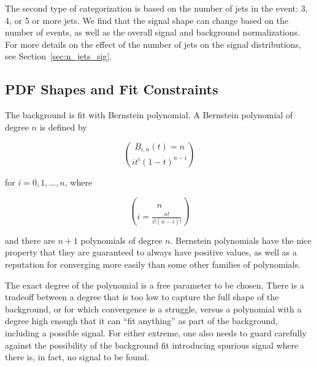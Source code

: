 The second type of categorization is based on the number of 
jets in the event: 3, 4, or 5 or more jets.  We find that the signal
shape can change based on the number of events, as well as the overall
signal and background normalizations.  For more details on the effect of 
the number of jets on the signal distributions, see Section~\ref{sec:n_jets_sig}. 




\subsection{PDF Shapes and Fit Constraints}
\label{sec:pdfs}

The background is fit with Bernstein polynomial.  A Bernstein polynomial of degree $n$ is
defined by

\begin{equation}
B_{i,n}(t) = n\choose{i} t^i (1-t)^{n-i}
\end{equation}

for $i=0,1,...,n$, where

\begin{equation}
n\choose{i} = \frac{n!}{i!(n-i)!}
\end{equation}

and there are $n+1$ polynomials of degree $n$.  Bernstein polynomials have the nice property
that they are guaranteed to always have positive values, as well as a reputation for
converging more easily than some other families of polynomials.

The exact degree of the polynomial is a free parameter to be chosen.  There is a tradeoff
between a degree that is too low to capture the full shape of the background, or for which
convergence is a struggle, versus a polynomial with a degree high enough that it can 
``fit anything'' as part of the background, including a possible signal.  For either 
extreme, one also needs to guard carefully against the possibility of the background fit
introducing spurious signal where there is, in fact, no signal to be found.   



